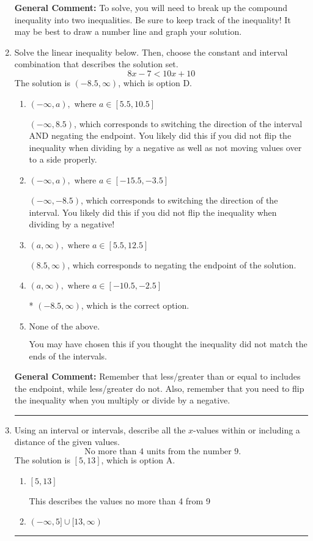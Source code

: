 \documentclass{extbook}[14pt]
\newcommand{\litem}[1]{\item #1

\rule{\textwidth}{0.4pt}}
\begin{document}
\begin{enumerate}
{\textbf{General Comment:} To solve, you will need to break up the compound inequality into two inequalities. Be sure to keep track of the inequality! It may be best to draw a number line and graph your solution.
}
\litem{
Solve the linear inequality below. Then, choose the constant and interval combination that describes the solution set.
\[ 8x -7 < 10x + 10 \]The solution is \( (-8.5, \infty) \), which is option D.\begin{enumerate}[label=\Alph*.]
\item \( (-\infty, a), \text{ where } a \in [5.5, 10.5] \)

 $(-\infty, 8.5)$, which corresponds to switching the direction of the interval AND negating the endpoint. You likely did this if you did not flip the inequality when dividing by a negative as well as not moving values over to a side properly.
\item \( (-\infty, a), \text{ where } a \in [-15.5, -3.5] \)

 $(-\infty, -8.5)$, which corresponds to switching the direction of the interval. You likely did this if you did not flip the inequality when dividing by a negative!
\item \( (a, \infty), \text{ where } a \in [5.5, 12.5] \)

 $(8.5, \infty)$, which corresponds to negating the endpoint of the solution.
\item \( (a, \infty), \text{ where } a \in [-10.5, -2.5] \)

* $(-8.5, \infty)$, which is the correct option.
\item \( \text{None of the above}. \)

You may have chosen this if you thought the inequality did not match the ends of the intervals.
\end{enumerate}

\textbf{General Comment:} Remember that less/greater than or equal to includes the endpoint, while less/greater do not. Also, remember that you need to flip the inequality when you multiply or divide by a negative.
}
\litem{
Using an interval or intervals, describe all the $x$-values within or including a distance of the given values.
\[ \text{ No more than } 4 \text{ units from the number } 9. \]The solution is \( [5, 13] \), which is option A.\begin{enumerate}[label=\Alph*.]
\item \( [5, 13] \)

This describes the values no more than 4 from 9
\item \( (-\infty, 5] \cup [13, \infty) \)


\end{enumerate}}
\end{enumerate}
\end{document}
